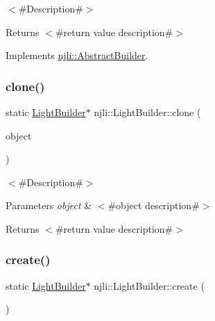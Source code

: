 $<$\#\+Description\#$>$

\begin{DoxyReturn}{Returns}
$<$\#return value description\#$>$ 
\end{DoxyReturn}


Implements \mbox{\hyperlink{classnjli_1_1_abstract_builder_aa1d220053e182c37b31b427499c6eacf}{njli\+::\+Abstract\+Builder}}.

\mbox{\label{classnjli_1_1_light_builder_a48ee256578d1390ef6bec7627a30a4c6}} 
\subsubsection{\texorpdfstring{clone()}{clone()}}
{\footnotesize\ttfamily static \mbox{\hyperlink{classnjli_1_1_light_builder}{Light\+Builder}}$\ast$ njli\+::\+Light\+Builder\+::clone (\begin{DoxyParamCaption}\item[{const \mbox{\hyperlink{classnjli_1_1_light_builder}{Light\+Builder}} \&}]{object }\end{DoxyParamCaption})\hspace{0.3cm}{\ttfamily [static]}}

$<$\#\+Description\#$>$


\begin{DoxyParams}{Parameters}
{\em object} & $<$\#object description\#$>$\\
\hline
\end{DoxyParams}
\begin{DoxyReturn}{Returns}
$<$\#return value description\#$>$ 
\end{DoxyReturn}
\mbox{\label{classnjli_1_1_light_builder_ab9c0ea3d00ad2542e86f67d49aa0143b}} 
\subsubsection{\texorpdfstring{create()}{create()}}
{\footnotesize\ttfamily static \mbox{\hyperlink{classnjli_1_1_light_builder}{Light\+Builder}}$\ast$ njli\+::\+Light\+Builder\+::create (\begin{DoxyParamCaption}{ }\end{DoxyParamCaption})\hspace{0.3cm}{\ttfamily [static]}}

